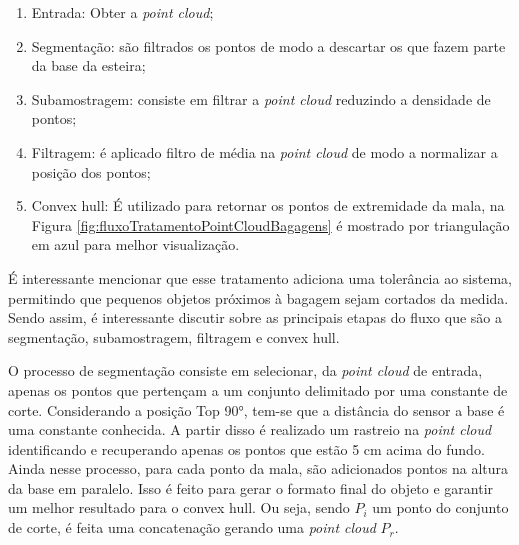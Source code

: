     \begin{enumerate}
        \item Entrada: Obter a \textit{point cloud};
        \item Segmentação: são filtrados os pontos de modo a descartar os que fazem parte da base da esteira;
        \item Subamostragem: consiste em filtrar a \textit{point cloud} reduzindo a densidade de pontos;
        \item Filtragem: é aplicado filtro de média na \textit{point cloud} de modo a normalizar a posição dos pontos;
        \item Convex hull: É utilizado para retornar os pontos de extremidade da mala, na Figura \ref{fig:fluxoTratamentoPointCloudBagagens} é mostrado por triangulação em azul para melhor visualização. 
    \end{enumerate}
    

    É interessante mencionar que esse tratamento adiciona uma tolerância ao sistema, permitindo que pequenos objetos próximos à bagagem sejam cortados da medida. Sendo assim, é interessante discutir sobre as principais etapas do fluxo que são a segmentação, subamostragem, filtragem e convex hull.



    O processo de segmentação consiste em selecionar, da \textit{point cloud} de entrada, apenas os pontos que pertençam a um conjunto delimitado por uma constante de corte. Considerando a posição Top 90°, tem-se que a distância do sensor a base é uma constante conhecida. A partir disso é realizado um rastreio na \textit{point cloud} identificando e recuperando apenas os pontos que estão 5 cm acima do fundo. Ainda nesse processo, para cada ponto da mala, são adicionados pontos na altura da base em paralelo. Isso é feito para gerar o formato final do objeto e garantir um melhor resultado para o convex hull. Ou seja, sendo $P_i$ um ponto do conjunto de corte, é feita uma concatenação gerando uma \textit{point cloud} $P_r$.
    
    
